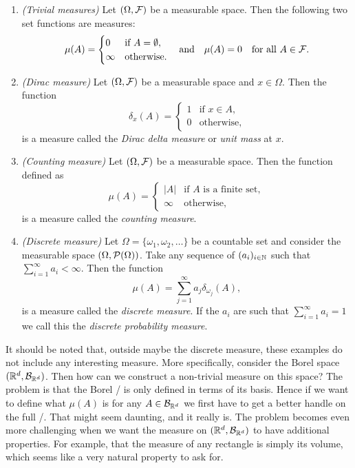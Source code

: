 \begin{example}
\hfil
\begin{enumerate}
\item \textit{(Trivial measures)} Let $(\Omega, \mathcal F)$ be a measurable space. Then the following two set functions are measures:
\[
	\mu(A) = \begin{cases}
		0 &\text{if } A = \emptyset, \\
		\infty &\text{otherwise.}
	\end{cases}
	\quad \text{and} \quad
	\mu(A) = 0 \quad \text{for all } A \in \mathcal F.
\]
\item \textit{(Dirac measure)} Let $(\Omega, \mathcal F)$ be a measurable space and $x \in \Omega$. Then the function
\[
	\delta_x(A) = \begin{cases}
		1 &\text{if } x \in A, \\
		0 &\text{otherwise},
	\end{cases}
\]
is a measure called the \emph{Dirac delta measure} or \emph{unit mass} at $x$.
\item \textit{(Counting measure)} Let $(\Omega, \mathcal F)$ be a measurable space. Then the function defined as
\[
	\mu(A) = \begin{cases}
		|A| &\text{if $A$ is a finite set},\\
		\infty &\text{otherwise}, 
	\end{cases}
\]
is a measure called the \emph{counting measure}.
\item \textit{(Discrete measure)} Let $\Omega = \{\omega_1, \omega_2, \dots\}$ be a countable set and consider the measurable space $(\Omega, \mathcal P(\Omega))$. Take any sequence of $(a_i)_{i \in \mathbb N}$ such that $\sum_{i = 1}^\infty a_i < \infty$. Then the function
\[
	\mu(A) = \sum_{j = 1}^\infty a_j \delta_{\omega_j}(A),
\]
is a measure called the \emph{discrete measure}. If the $a_i$ are such that $\sum_{i = 1}^\infty a_i = 1$ we call this the \emph{discrete probability measure}.
\end{enumerate}
\end{example}

It should be noted that, outside maybe the discrete measure, these examples do not include any interesting measure. More specifically, consider the Borel space $(\mathbb R^d, \mathcal B_{\mathbb R^d})$. Then how can we construct a non-trivial measure on this space? The problem is that the Borel \sigalg/ is only defined in terms of its basis. Hence if we want to define what $\mu(A)$ is for any $A \in \mathcal B_{\mathbb R^d}$ we first have to get a better handle on the full \sigalg/. That might seem daunting, and it really is. The problem becomes even more challenging when we want the measure on $(\mathbb R^d, \mathcal B_{\mathbb R^d})$ to have additional properties. For example, that the measure of any rectangle is simply its volume, which seems like a very natural property to ask for. 

